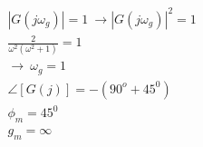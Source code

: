 \documentclass[twoside]{article}
\begin{document}
\begin{minipage}[h]{0.5\linewidth}
    \begin{center}
      \begin{align*}
         & | G( j \omega_g ) | = 1 \ \rightarrow  | G( j \omega_g ) |^2 = 1
        \\
        & \frac{2}{\omega^2 (\omega^2 + 1)} = 1 
        \\
        & \rightarrow \ \omega_g = 1
          \\
        &\angle [ G( j ) ] = - ( 90^o+ 45^0) 
        \\
        &\phi_m = 45^0
        \\ 
        &g_m = \infty
      \end{align*}
    \end{center}
\end{minipage}


\end{document}
